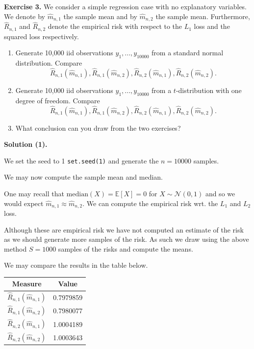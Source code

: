 \documentclass[
]{book}
\providecommand{\tightlist}{%
  \setlength{\itemsep}{0pt}\setlength{\parskip}{0pt}}
\begin{document}
\textbf{Exercise 3.} We consider a simple regression case with no explanatory variables. We denote by \(\hat m_{n,1}\) the sample mean and by \(\hat m_{n,2}\) the sample mean. Furthermore, \(\hat R_{n,1}\) and \(\hat R_{n,2}\) denote the empirical risk with respect to the \(L_1\) loss and the squared loss respectively.

\begin{enumerate}
\def\labelenumi{\arabic{enumi}.}
\tightlist
\item
  Generate 10,000 iid observations \(y_1,...,y_{10000}\) from a standard normal distribution. Compare
  \[
    \hat R_{n,1}(\hat m_{n,1}),\hat R_{n,1}(\hat m_{n,2}),\hat R_{n,2}(\hat m_{n,1}),\hat R_{n,2}(\hat m_{n,2}).
    \]
\item
  Generate 10,000 iid observations \(y_1,...,y_{10000}\) from a \(t\)-distribution with one degree of freedom. Compare
  \[
    \hat R_{n,1}(\hat m_{n,1}),\hat R_{n,1}(\hat m_{n,2}),\hat R_{n,2}(\hat m_{n,1}),\hat R_{n,2}(\hat m_{n,2}).
    \]
\item
  What conclusion can you draw from the two exercises?
\end{enumerate}

\textbf{Solution (1).}

We set the seed to 1 \texttt{set.seed(1)} and generate the \(n=10000\) samples.

We may now compute the sample mean and median.

One may recall that \(\text{median}(X)=\mathbb E[X]=0\) for \(X\sim \mathcal N(0,1)\) and so we would expect \(\hat m_{n,1}\approx \hat m_{n,2}\). We can compute the empirical risk wrt. the \(L_1\) and \(L_2\) loss.

Although these are empirical risk we have not computed an estimate of the risk as we should generate more samples of the risk. As such we draw using the above method \(S=1000\) samples of the risks and compute the means.

We may compare the results in the table below.

\begin{longtable}[]{@{}cc@{}}
\toprule()
Measure & Value \\
\midrule()
\endhead
\(\hat R_{n,1}(\hat m_{n,1})\) & 0.7979859 \\
\(\hat R_{n,1}(\hat m_{n,2})\) & 0.7980077 \\
\(\hat R_{n,2}(\hat m_{n,1})\) & 1.0004189 \\
\(\hat R_{n,2}(\hat m_{n,2})\) & 1.0003643 \\
\bottomrule()
\end{longtable}
\end{document}
